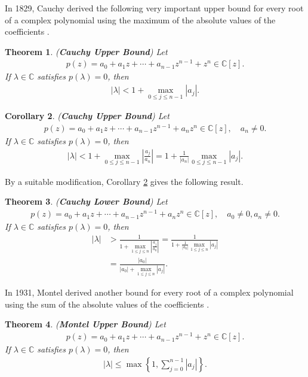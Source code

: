 \documentclass{amsart}
\newtheorem{theorem}{Theorem}[section]
\newtheorem{corollary}[theorem] {Corollary}
\begin{document}
In 1829, Cauchy derived the following very important upper bound for every root of a complex polynomial using the maximum of the absolute values of the coefficients \cite{CAUCHY}.
\begin{theorem} \cite{HIRSTMACEY, RAHMANSCHMEISSER, MARDEN} \label{CB} (\textbf{Cauchy Upper Bound}) Let 
	\begin{align*}
		p(z)=a_0+a_1z+\cdots+a_{n-1}z^{n-1}+z^n\in \mathbb{C}[z].
	\end{align*}
	If $\lambda \in \mathbb{C}$ satisfies $p(\lambda)=0$, then 
	\begin{align*}
		|\lambda|< 1+\max_{0\leq j \leq n-1}|a_j|.
	\end{align*}
\end{theorem}
\begin{corollary} \label{CBC}\cite{HIRSTMACEY, RAHMANSCHMEISSER, MARDEN}
(\textbf{Cauchy Upper Bound}) Let 
\begin{align*}
	p(z)=a_0+a_1z+\cdots+a_{n-1}z^{n-1}+a_nz^n\in \mathbb{C}[z], \quad a_n \neq 0.
\end{align*}
If $\lambda \in \mathbb{C}$ satisfies $p(\lambda)=0$, then 
\begin{align*}
	|\lambda|< 1+\max_{0\leq j \leq n-1}\left|\frac{a_j}{a_n}\right|=1+\frac{1}{|a_n|}\max_{0\leq j \leq n-1}|a_j|.
\end{align*}	
\end{corollary}
By a suitable modification, Corollary \ref{CBC} gives the following result. 
\begin{theorem}\label{CLB}
\cite{HIRSTMACEY, RAHMANSCHMEISSER, MARDEN}
(\textbf{Cauchy Lower Bound}) Let 
\begin{align*}
	p(z)=a_0+a_1z+\cdots+a_{n-1}z^{n-1}+a_nz^n\in \mathbb{C}[z], \quad a_0\neq 0, a_n \neq 0.
\end{align*}
If $\lambda \in \mathbb{C}$ satisfies $p(\lambda)=0$, then 
\begin{align*}
|\lambda|&>\frac{1}{1+\max_{1\leq j \leq n}\left|\frac{a_j}{a_0}\right|}=\frac{1}{1+\frac{1}{|a_0|}\max_{1\leq j \leq n}|a_j|}\\
&=\frac{|a_0|}{|a_0|+\max_{1\leq j \leq n}\left|a_j\right|}.
\end{align*}		
\end{theorem}
In 1931, Montel derived another bound  for every root of a complex polynomial using the sum of the absolute values of the coefficients \cite{MONTEL}.
\begin{theorem} \cite{HIRSTMACEY, RAHMANSCHMEISSER, MARDEN}  \label{MB}   (\textbf{Montel Upper Bound}) Let 
	\begin{align*}
		p(z)=a_0+a_1z+\cdots+a_{n-1}z^{n-1}+z^n\in \mathbb{C}[z].
	\end{align*}
	If $\lambda \in \mathbb{C}$ satisfies $p(\lambda)=0$, then 
	\begin{align*}
		|\lambda|\leq \max\left\{1, \sum_{j=0}^{n-1}|a_j|\right\}.
	\end{align*}
\end{theorem}
\end{document}
